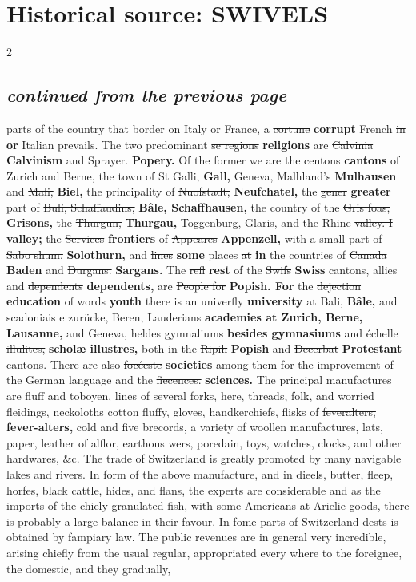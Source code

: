 \documentclass[10pt]{article}
\begin{document}
\section*{Historical source: SWIVELS}
\begin{multicols}{2}
\subsection*{\textit{continued from the previous page}}
parts of the country that border on Italy or France, a \sout{cortune} \textbf{corrupt} French \sout{in} \textbf{or} Italian prevails. The two predominant \sout{se regions} \textbf{religions} are \sout{Calvinia} \textbf{Calvinism} and \sout{Sprayer.} \textbf{Popery.} Of the former \sout{we} are the \sout{centons} \textbf{cantons} of Zurich and Berne, the town of St \sout{Galli,} \textbf{Gall,} Geneva, \sout{Malhland’s} \textbf{Mulhausen} and \sout{Mali,} \textbf{Biel,} the principality of \sout{Nuofstadt,} \textbf{Neufchatel,} the \sout{gener} \textbf{greater} part of \sout{Buli, Schaffaudins,} \textbf{Bâle, Schaffhausen,} the country of the \sout{Gris foas,} \textbf{Grisons,} the \sout{Thurgun,} \textbf{Thurgau,} Toggenburg, Glaris, and the Rhine \sout{valley. I} \textbf{valley;} the \sout{Services} \textbf{frontiers} of \sout{Appeares} \textbf{Appenzell,} with a small part of \sout{Sabo shum,} \textbf{Solothurn,} and \sout{lines} \textbf{some} places \sout{at} \textbf{in} the countries of \sout{Canada} \textbf{Baden} and \sout{Durgans.} \textbf{Sargans.} The \sout{refl} \textbf{rest} of the \sout{Swifs} \textbf{Swiss} cantons, allies and \sout{dependents} \textbf{dependents,} are \sout{People for} \textbf{Popish. For} the \sout{dejection} \textbf{education} of \sout{words} \textbf{youth} there is an \sout{univerfly} \textbf{university} at \sout{Bali,} \textbf{Bâle,} and \sout{scadoniais e zurücke, Beren, Lauderians} \textbf{academies at Zurich, Berne, Lausanne,} and Geneva, \sout{heldes gymnaliums} \textbf{besides gymnasiums} and \sout{échelle illulites,} \textbf{scholæ illustres,} both in the \sout{Ripih} \textbf{Popish} and \sout{Decerbat} \textbf{Protestant} cantons. There are also \sout{focéeste} \textbf{societies} among them for the improvement of the German language and the \sout{fiecences.} \textbf{sciences.} The principal manufactures are fluff and toboyen, lines of several forks, here, threads, folk, and worried fleidings, neckoloths cotton fluffy, gloves, handkerchiefs, flisks of \sout{feveralters,} \textbf{fever-alters,} cold and five brecords, a variety of woollen manufactures, lats, paper, leather of alflor, earthous wers, poredain, toys, watches, clocks, and other hardwares, \&c. The trade of Switzerland is greatly promoted by many navigable lakes and rivers. In form of the above manufacture, and in dieels, butter, fleep, horfes, black cattle, hides, and flans, the experts are considerable and as the imports of the chiely granulated fish, with some Americans at Arielie goods, there is probably a large balance in their favour. In fome parts of Switzerland dests is obtained by fampiary law. The public revenues are in general very incredible, arising chiefly from the usual regular, appropriated every where to the foreignee, the domestic, and they gradually, 
\end{multicols}
\end{document}
